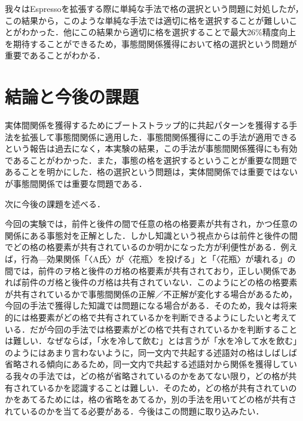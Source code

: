 \documentclass[japanese]{jnlp_1.4}
\begin{document}
我々はEspressoを拡張する際に単純な手法で格の選択という問題に対処したが，
この結果から，このような単純な手法では適切に格を選択することが難しいこ
とがわかった．他にこの結果から適切に格を選択することで最大26\%精度向上
を期待することができるため，事態間関係獲得において格の選択という問題が
重要であることがわかる．


\section{結論と今後の課題}
\label{sec:discussion}

実体間関係を獲得するためにブートストラップ的に共起パターンを獲得する手
法を拡張して事態間関係に適用した．事態間関係獲得にこの手法が適用できる
という報告は過去になく，本実験の結果，この手法が事態間関係獲得にも有効
であることがわかった．また，事態の格を選択するということが重要な問題で
あることを明かにした．格の選択という問題は，実体間関係では重要ではない
が事態間関係では重要な問題である．

次に今後の課題を述べる．

今回の実験では，前件と後件の間で任意の格の格要素が共有され，かつ任意の
関係にある事態対を正解とした．しかし知識という視点からは前件と後件の間
でどの格の格要素が共有されているのか明かになった方が利便性がある．例え
ば，行為—効果関係「〈A氏〉が〈花瓶〉を投げる」と「〈花瓶〉が壊れる」の
間では，前件のヲ格と後件のガ格の格要素が共有されており，正しい関係であ
れば前件のガ格と後件のガ格は共有されていない．このようにどの格の格要素
が共有されているかで事態間関係の正解／不正解が変化する場合があるため，
今回の手法で獲得した知識では問題になる場合がある．そのため，我々は将来
的には格要素がどの格で共有されているかを判断できるようにしたいと考えて
いる．だが今回の手法では格要素がどの格で共有されているかを判断すること
は難しい．なぜならば，「水を冷して飲む」とは言うが「水を冷して水を飲む」
のようにはあまり言わないように，同一文内で共起する述語対の格はしばしば
省略される傾向にあるため，同一文内で共起する述語対から関係を獲得してい
る我々の手法では，どの格が省略されているのかをあてない限り，どの格が共
有されているかを認識することは難しい．そのため，どの格が共有されていの
かをあてるためには，格の省略をあてるか，別の手法を用いてどの格が共有さ
れているのかを当てる必要がある．今後はこの問題に取り込みたい．
\end{document}
